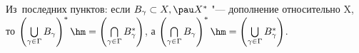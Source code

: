 \label{Themor}
            Из~последних пунктов: если $B_\gamma\subset X, \pau X^*$ "--- дополнение относительно X, то $
            \left(\bigcup\limits_{\gamma\in\Gamma}B_\gamma\right)^*\hm=
            \left(\bigcap\limits_{\gamma\in\Gamma}B_\gamma^*\right)$, а
            $\left(\bigcap\limits_{\gamma\in\Gamma} B_\gamma\right)^*\hm=
            \left(\bigcup\limits_{\gamma\in\Gamma}B_\gamma^*\right)$.
        